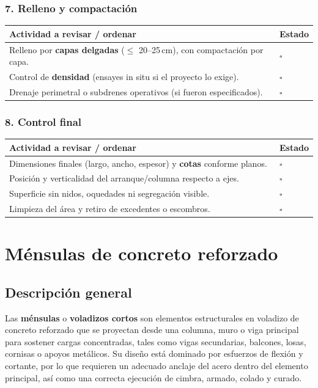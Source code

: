 \documentclass[12pt]{article}
\newcommand{\cbox}{\(\square\)}
\renewcommand{\cbox}{\(\square\)} %
\begin{document}
	\subsubsection*{7. Relleno y compactación}
	\begin{tabularx}{\linewidth}{>{\raggedright\arraybackslash}p{0.93\linewidth} >{\centering\arraybackslash}m{0.07\linewidth}}
		\toprule
		\textbf{Actividad a revisar / ordenar} & \textbf{Estado}\\
		\midrule
		Relleno por \textbf{capas delgadas} (\(\leq\) 20--25\,cm), con compactación por capa. & \cbox \\
		Control de \textbf{densidad} (ensayes in situ si el proyecto lo exige). & \cbox \\
		Drenaje perimetral o subdrenes operativos (si fueron especificados). & \cbox \\
		\bottomrule
	\end{tabularx}
	
	\subsubsection*{8. Control final}
	\begin{tabularx}{\linewidth}{>{\raggedright\arraybackslash}p{0.93\linewidth} >{\centering\arraybackslash}m{0.07\linewidth}}
		\toprule
		\textbf{Actividad a revisar / ordenar} & \textbf{Estado}\\
		\midrule
		Dimensiones finales (largo, ancho, espesor) y \textbf{cotas} conforme planos. & \cbox \\
		Posición y verticalidad del arranque/columna respecto a ejes. & \cbox \\
		Superficie sin nidos, oquedades ni segregación visible. & \cbox \\
		Limpieza del área y retiro de excedentes o escombros. & \cbox \\
		\bottomrule
	\end{tabularx}
	
	
	
	
	
	
	\section{Ménsulas de concreto reforzado}
	
	\subsection*{Descripción general}
	Las \textbf{ménsulas} o \textbf{voladizos cortos} son elementos estructurales en voladizo de concreto reforzado que se proyectan desde una columna, muro o viga principal para sostener cargas concentradas, tales como vigas secundarias, balcones, losas, cornisas o apoyos metálicos.  
	Su diseño está dominado por esfuerzos de flexión y cortante, por lo que requieren un adecuado anclaje del acero dentro del elemento principal, así como una correcta ejecución de cimbra, armado, colado y curado.
	
\end{document}

